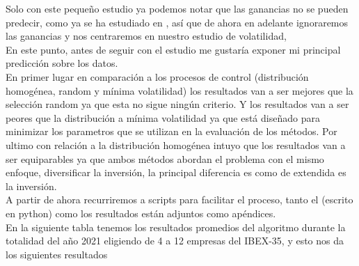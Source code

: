 \documentclass[12pt,a4paper]{article}
\begin{document}
		Solo con este pequeño estudio ya podemos notar que las ganancias no se pueden predecir, como ya se ha estudiado en \cite{Prediction}, así que de ahora en adelante ignoraremos las ganancias y nos centraremos en nuestro estudio de volatilidad,\\
		En este punto, antes de seguir con el estudio me gustaría exponer mi principal predicción sobre los datos.\\
		En primer lugar en comparación a los procesos de control (distribución homogénea, random y mínima volatilidad) los resultados van a ser mejores que la selección random ya que esta no sigue ningún criterio. Y los resultados van a ser peores que la distribución a mínima volatilidad ya que está diseñado para minimizar los parametros que se utilizan en la evaluación de los métodos. Por ultimo con relación a la distribución homogénea intuyo que los resultados van a ser equiparables ya que ambos métodos abordan el problema con el mismo enfoque, diversificar la inversión, la principal diferencia es como de extendida es la inversión.\\
A partir de ahora recurriremos a scripts para facilitar el proceso, tanto el (escrito en python) como los resultados están adjuntos como apéndices.\\
En la siguiente tabla tenemos los resultados promedios del algoritmo durante la totalidad del año 2021 eligiendo de 4 a 12 empresas del IBEX-35, y esto nos da los siguientes resultados
\end{document}
